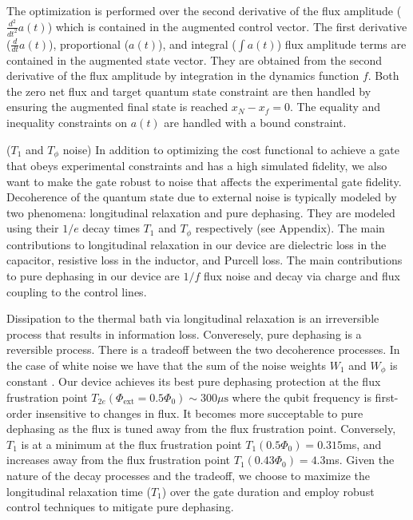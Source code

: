 \documentclass[
  amsfonts,
  amsmath,
  tbtags,
  amssymb,
  aps,
  nobibnotes,
  twocolumn,
]{revtex4-2}
\begin{document}
The optimization is performed over the second derivative of the flux amplitude
($\frac{d^{2}}{dt^{2}} a(t)$) which is contained in the
augmented control vector. The first derivative
($\frac{d}{dt} a(t)$), proportional ($a(t)$), and integral ($\int a(t)$)
flux amplitude terms
are contained in the augmented state vector. They are obtained from
the second derivative of the flux amplitude by
integration in the dynamics function $f$.
Both the zero net flux and target quantum state constraint
are then handled by ensuring the augmented final state is
reached $x_{N} - x_{f} = 0$.
The equality and inequality constraints on $a(t)$ are handled
with a bound constraint.

($T_{1}$ and $T_{\phi}$ noise)
In addition to optimizing the cost functional to achieve a gate
that obeys experimental constraints and has a high simulated fidelity,
we also want to make the gate robust to noise that affects the experimental
gate fidelity. Decoherence of the quantum state due to external noise
is typically modeled by two phenomena: longitudinal relaxation and pure dephasing.
They are modeled using their $1/e$ decay times $T_{1}$ and $T_{\phi}$ respectively
(see Appendix).
The main contributions to longitudinal relaxation in our
device are dielectric loss in the capacitor, resistive loss in the inductor,
and Purcell loss. The main contributions to pure dephasing in our
device are $1/f$ flux noise and decay via charge and flux coupling
to the control lines.

Dissipation to the thermal bath via longitudinal
relaxation is an irreversible process
that results in information loss.
Converesely, pure dephasing is a reversible process.
There is a tradeoff between the two decoherence processes. In the case of white
noise we have that the sum of the noise weights $W_{1}$ and $W_{\phi}$
is constant \cite{huang2020engineering}.
Our device achieves its best pure dephasing
protection at the flux frustration point
$T_{2e}(\Phi_{\textrm{ext}} = 0.5 \Phi_{0}) \sim 300 \mu\textrm{s}$
where the qubit frequency is first-order insensitive to changes in flux.
It becomes more succeptable to pure dephasing as the flux is tuned away from the flux
frustration point. Conversely, $T_{1}$ is at a minimum
at the flux frustration point $T_{1}(0.5 \Phi_{0}) = 0.315$ms,
and increases away from the flux frustration point
$T_{1}(0.43 \Phi_{0}) = 4.3$ms. Given the nature
of the decay processes and the tradeoff, we choose
to maximize the longitudinal relaxation time ($T_{1}$)
over the gate duration
and employ robust control techniques to mitigate
pure dephasing.
\end{document}
